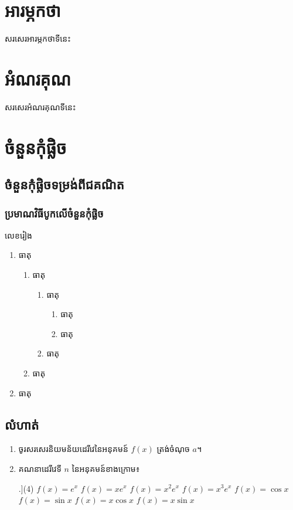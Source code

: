 \documentclass[12pt,a4paper]{book}
\begin{document}
	\frontmatter
	\tableofcontents
	\clearpage
	\chapter{អារម្ភកថា}
	សរសេរអារម្ភកថាទីនេះ
	\chapter{អំណរគុណ}
	សរសេរអំណរគុណទីនេះ
	\mainmatter
	\chapter{ចំនួនកុំផ្លិច}
	\section{ចំនួនកុំផ្លិចទម្រង់ពីជគណិត}
	\subsection{ប្រមាណវិធីបូកលើចំនួនកុំផ្លិច}
	\begin{dfn}
		លេខរៀង
		\begin{enumerate}
			\item ធាតុ
			\begin{enumerate}
				\item ធាតុ
				\begin{enumerate}
					\item ធាតុ
					\begin{enumerate}
						\item ធាតុ
						\item ធាតុ
					\end{enumerate}
					\item ធាតុ
				\end{enumerate}
				\item ធាតុ
			\end{enumerate}
			\item ធាតុ
		\end{enumerate}
	\end{dfn}
\section*{លំហាត់}
\begin{enumerate}
	\item ចូរសរសេរនិយមន័យដេរីវេនៃអនុគមន៍ $ f(x) $ ត្រង់ចំណុច $ a $។
	\item គណនាដេរីវេទី $ n $ នៃអនុគមន៍ខាងក្រោម៖
	\begin{tasks}[counter-format=tsk[k].](4)
		\task $ f(x)=e^x $
		\task $ f(x)=x e^x $
		\task $ f(x)=x^2 e^x $
		\task $ f(x)=x^3 e^x $
		\task $ f(x)=\cos x $
		\task $ f(x)=\sin x $
		\task $ f(x)=x\cos x $
		\task $ f(x)=x\sin x $
	\end{tasks}
\end{enumerate}
\end{document}
